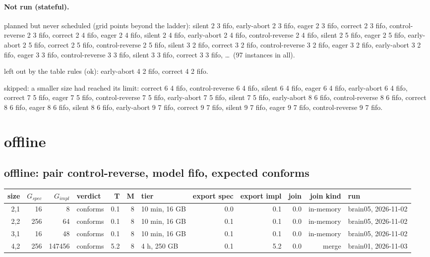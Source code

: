 \documentclass[10pt]{article}
\begin{document}
\paragraph{Not run (stateful).}
planned but never scheduled (grid points beyond the ladder): silent 2 3 fifo, early-abort 2 3 fifo, eager 2 3 fifo, correct 2 3 fifo, control-reverse 2 3 fifo, correct 2 4 fifo, eager 2 4 fifo, silent 2 4 fifo, early-abort 2 4 fifo, control-reverse 2 4 fifo, silent 2 5 fifo, eager 2 5 fifo, early-abort 2 5 fifo, correct 2 5 fifo, control-reverse 2 5 fifo, silent 3 2 fifo, correct 3 2 fifo, control-reverse 3 2 fifo, eager 3 2 fifo, early-abort 3 2 fifo, eager 3 3 fifo, control-reverse 3 3 fifo, silent 3 3 fifo, correct 3 3 fifo, \ldots\ (97 instances in all).\par
left out by the table rules (ok): early-abort 4 2 fifo, correct 4 2 fifo.\par
skipped: a smaller size had reached its limit: correct 6 4 fifo, control-reverse 6 4 fifo, silent 6 4 fifo, eager 6 4 fifo, early-abort 6 4 fifo, correct 7 5 fifo, eager 7 5 fifo, control-reverse 7 5 fifo, early-abort 7 5 fifo, silent 7 5 fifo, early-abort 8 6 fifo, control-reverse 8 6 fifo, correct 8 6 fifo, eager 8 6 fifo, silent 8 6 fifo, early-abort 9 7 fifo, correct 9 7 fifo, silent 9 7 fifo, eager 9 7 fifo, control-reverse 9 7 fifo.\par
\section*{offline}
\subsection*{offline: pair \textsf{control-reverse}, model fifo, expected conforms}
\begin{longtable}{@{}rrrlrrlrrrrl@{}}
\toprule
size & $G_{\mathit{spec}}$ & $G_{\mathit{impl}}$ & verdict & T & M & tier & export spec & export impl & join & join kind & run \\
\midrule
\endhead
\color{red} 2,1 & 16 & 8 & conforms & 0.1 & 8 & 10 min, 16 GB & 0.0 & 0.1 & 0.0 & in-memory & brain05, 2026-11-02 \\
\color{red} 2,2 & 256 & 64 & conforms & 0.1 & 8 & 10 min, 16 GB & 0.1 & 0.1 & 0.0 & in-memory & brain05, 2026-11-02 \\
\color{red} 3,1 & 16 & 48 & conforms & 0.1 & 8 & 10 min, 16 GB & 0.1 & 0.1 & 0.0 & in-memory & brain05, 2026-11-02 \\
\color{blue} 4,2 & 256 & 147456 & conforms & 5.2 & 8 & 4 h, 250 GB & 0.1 & 5.2 & 0.0 & merge & brain01, 2026-11-03 \\
\bottomrule
\end{longtable}
\end{document}
